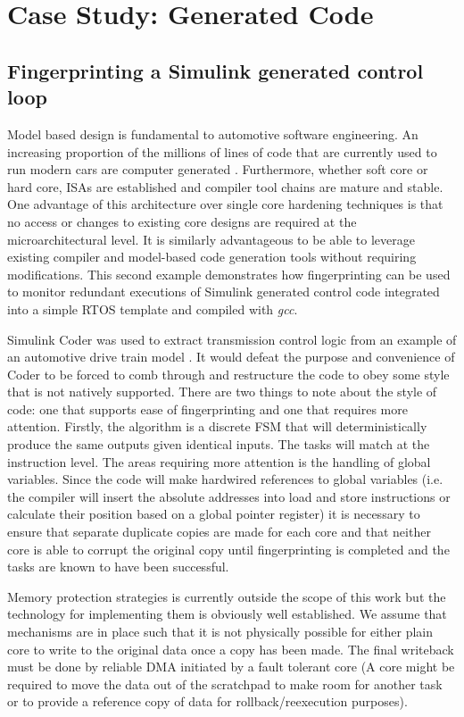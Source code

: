 \section{Case Study: Generated Code}
\label{s:matlabstudy}

\subsection{Fingerprinting a Simulink generated control loop}
Model based design is fundamental to automotive software engineering. An increasing proportion of the millions of lines of code that are currently used to run modern cars are computer generated \cite{mossinger2010software}. Furthermore, whether soft core or hard core, ISAs are established and compiler tool chains are mature and stable. One advantage of this architecture over single core hardening techniques is that no access or changes to existing core designs are required at the microarchitectural level. It is similarly advantageous to be able to leverage existing compiler and model-based code generation tools without requiring modifications. This second example demonstrates how fingerprinting can be used to monitor redundant executions of Simulink generated control code integrated into a simple RTOS template and compiled with \emph{gcc}.

Simulink Coder was used to extract transmission control logic from an example of an automotive drive train model \cite{sim_trans}. It would defeat the purpose and convenience of Coder to be forced to comb through and restructure the code to obey some style that is not natively supported. There are two things to note about the style of code: one that supports ease of fingerprinting and one that requires more attention. Firstly, the algorithm is a discrete FSM that will deterministically produce the same outputs given identical inputs. The tasks will match at the instruction level. The areas requiring more attention is the handling of global variables. Since the code will make hardwired references to global variables (i.e. the compiler will insert the absolute addresses into load and store instructions or calculate their position based on a global pointer register) it is necessary to ensure that separate duplicate copies are made for each core and that neither core is able to corrupt the original copy until fingerprinting is completed and the tasks are known to have been successful. 

Memory protection strategies is currently outside the scope of this work but the technology for implementing them is obviously well established. We assume that mechanisms are in place such that it is not physically possible for either plain core to write to the original data once a copy has been made. The final writeback must be done by reliable DMA initiated by a fault tolerant core (A core might be required to move the data out of the scratchpad to make room for another task or to provide a reference copy of data for rollback/reexecution purposes).

